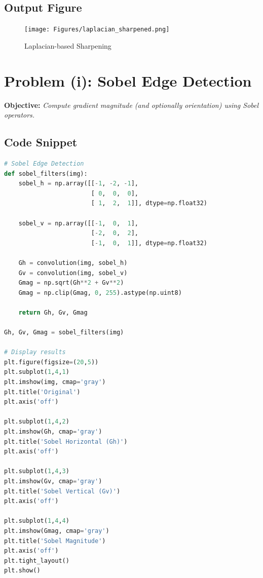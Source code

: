 \documentclass[12pt,a4paper]{report}
\begin{document}
\subsection{Output Figure}
\begin{figure}[H]
\centering
\texttt{[image: Figures/laplacian\_sharpened.png]}
\caption{Laplacian-based Sharpening}
\end{figure}

\section{Problem (i): Sobel Edge Detection}
\textbf{Objective:} \textit{Compute gradient magnitude (and optionally orientation) using Sobel operators.}

\subsection{Code Snippet}
\begin{lstlisting}[language=Python, caption={Sobel Filters (H \& V, Magnitude)}]
# Sobel Edge Detection
def sobel_filters(img):
    sobel_h = np.array([[-1, -2, -1],
                        [ 0,  0,  0],
                        [ 1,  2,  1]], dtype=np.float32)
    
    sobel_v = np.array([[-1,  0,  1],
                        [-2,  0,  2],
                        [-1,  0,  1]], dtype=np.float32)
    
    Gh = convolution(img, sobel_h)
    Gv = convolution(img, sobel_v)
    Gmag = np.sqrt(Gh**2 + Gv**2)
    Gmag = np.clip(Gmag, 0, 255).astype(np.uint8)
    
    return Gh, Gv, Gmag

Gh, Gv, Gmag = sobel_filters(img)

# Display results
plt.figure(figsize=(20,5))
plt.subplot(1,4,1)
plt.imshow(img, cmap='gray')
plt.title('Original')
plt.axis('off')

plt.subplot(1,4,2)
plt.imshow(Gh, cmap='gray')
plt.title('Sobel Horizontal (Gh)')
plt.axis('off')

plt.subplot(1,4,3)
plt.imshow(Gv, cmap='gray')
plt.title('Sobel Vertical (Gv)')
plt.axis('off')

plt.subplot(1,4,4)
plt.imshow(Gmag, cmap='gray')
plt.title('Sobel Magnitude')
plt.axis('off')
plt.tight_layout()
plt.show()
\end{lstlisting}
\end{document}
